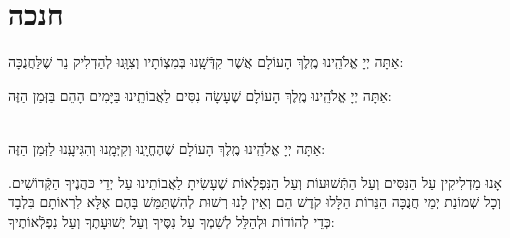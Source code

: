 \documentclass[twoside, openany, parskip=half, 11pt]{book}
\begin{document}
\vfill
{}\pageref{vihi noam}\\
\pageref{v ata kadosh}\\
\pageref{end of shacharis} 


\sepline

\chapter[חנכה]{ חנכה }
\label{chanukah}

 אַתָּה יְיָ אֱלֹהֵֽינוּ מֶֽלֶךְ הָעוֹלָם 
אֲשֶׁר קִדְּֿשָֽׁנוּ בְּמִצְוֹתָיו וְצִוָּֽנוּ לְהַדְלִיק נֵר שֶׁלַּחֲנֻכָּה: 

 אַתָּה יְיָ אֱלֹהֵֽינוּ מֶֽלֶךְ הָעוֹלָם שֶׁעָשָׂה נִסִּים לַאֲבוֹתֵֽינוּ בַּיָּמִים הָהֵם בַּזְּמַן הַזֶּה:

\\
 אַתָּה יְיָ אֱלֹהֵֽינוּ מֶֽלֶךְ הָעוֹלָם שֶׁהֶחֱיָֽנוּ וְקִיְּמָֽנוּ וְהִגִּיעָֽנוּ לַזְּמַן הַזֶּה:

אָנוּ מַדְלִיקִין
עַל הַנִּסִּים וְעַל הַתְּֿשׁוּעוֹת 
וְעַל הַנִּפְלָאוֹת 
שֶׁעָשִׂיתָ לַאֲבוֹתֵינוּ
עַל יְדֵי כּהֲנֶיךָ הַקְּֿדוֹשִׁים.
וְכָל שְׁמוֹנַת יְמֵי חֲנֻכָּה
הַנֵּרוֹת הַלָּלוּ קֹדֶשׁ הֵם
וְאֵין לָנוּ רְשׁוּת לְהִשְׁתַּמֵּשׁ בָּהֶם
אֶלָּא לִרְאוֹתָם בִּלְבָד
כְּדֵי לְהוֹדוֹת וּלְהַלֵּל לְשִׁמְךָ 
עַל נִסֶּיךָ וְעַל יְשׁוּעָתֶךָ
וְעַל נִפְלְֿאוֹתֶיךָ:
\end{document}
